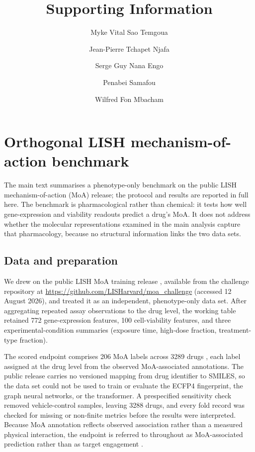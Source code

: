 \documentclass[11pt,a4paper]{article}
\title{Supporting Information}
\author{Myke Vital Sao Temgoua \and Jean-Pierre Tchapet Njafa \and Serge Guy Nana Engo \and Penabei Samafou \and Wilfred Fon Mbacham}
\date{}
\begin{document}
\maketitle

\section{Orthogonal LISH mechanism-of-action benchmark}
\label{sec:lish_si}

The main text summarises a phenotype-only benchmark on the public LISH mechanism-of-action (MoA) release; the protocol and results are reported in full here. The benchmark is pharmacological rather than chemical: it tests how well gene-expression and viability readouts predict a drug's MoA. It does not address whether the molecular representations examined in the main analysis capture that pharmacology, because no structural information links the two data sets.

\subsection{Data and preparation}

We drew on the public LISH MoA training release \citep{lish_moa_2019}, available from the challenge repository at \url{https://github.com/LISHarvard/moa_challenge} (accessed 12 August 2026), and treated it as an independent, phenotype-only data set. After aggregating repeated assay observations to the drug level, the working table retained \num{772} gene-expression features, \num{100} cell-viability features, and three experimental-condition summaries (exposure time, high-dose fraction, treatment-type fraction).

The scored endpoint comprises \num{206} MoA labels across \num{3289} drugs \citep{Trapotsi2022MoA}, each label assigned at the drug level from the observed MoA-associated annotations. The public release carries no versioned mapping from drug identifier to SMILES, so the data set could not be used to train or evaluate the ECFP4 fingerprint, the graph neural networks, or the transformer. A prespecified sensitivity check removed vehicle-control samples, leaving \num{3288} drugs, and every fold record was checked for missing or non-finite metrics before the results were interpreted. Because MoA annotation reflects observed association rather than a measured physical interaction, the endpoint is referred to throughout as MoA-associated prediction rather than as target engagement \citep{Trapotsi2022MoA}.
\end{document}

